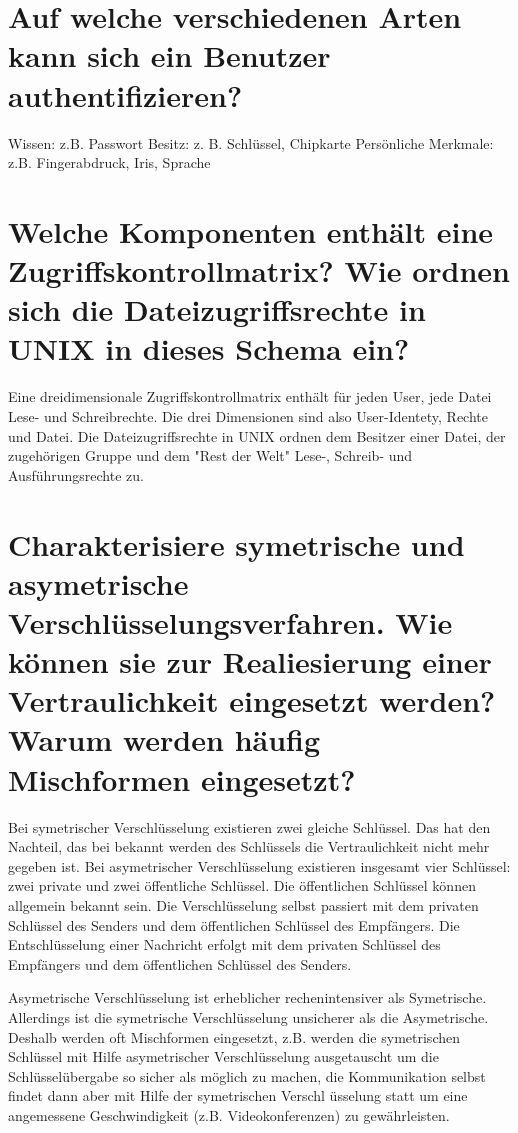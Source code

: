 \documentclass[12pt,a4paper,ngerman]{scrartcl}
\newcommand{\question}[1]{#1}
\newenvironment {answer}
                {}
                {}
\begin{document}
\section{\question{Auf welche verschiedenen Arten kann sich ein Benutzer authentifizieren?}}
\begin{answer}
Wissen: z.B. Passwort
Besitz: z. B. Schlüssel, Chipkarte
Persönliche Merkmale: z.B. Fingerabdruck, Iris, Sprache
\end{answer}

\section{\question{Welche Komponenten enthält eine Zugriffskontrollmatrix? Wie ordnen sich die Dateizugriffsrechte in UNIX in dieses Schema ein?}}
\begin{answer}
Eine dreidimensionale Zugriffskontrollmatrix enthält für jeden User, jede Datei Lese- und Schreibrechte.
Die drei Dimensionen sind also User-Identety, Rechte und Datei.
Die Dateizugriffsrechte in UNIX ordnen dem Besitzer einer Datei, der zugehörigen Gruppe und
dem "Rest der Welt" Lese-, Schreib- und Ausführungsrechte zu.
\end{answer}

\section{\question{Charakterisiere symetrische und asymetrische Verschlüsselungsverfahren. Wie können sie zur Realiesierung einer Vertraulichkeit eingesetzt werden? Warum werden häufig Mischformen eingesetzt?}}
\begin{answer}
Bei symetrischer Verschlüsselung existieren zwei gleiche Schlüssel. Das hat den Nachteil, das bei bekannt werden des Schlüssels die Vertraulichkeit nicht mehr gegeben ist.
Bei asymetrischer Verschlüsselung existieren insgesamt vier Schlüssel: zwei private und zwei öffentliche Schlüssel. Die öffentlichen Schlüssel können allgemein bekannt sein. Die Verschlüsselung selbst passiert mit dem privaten Schlüssel des Senders und dem öffentlichen Schlüssel des Empfängers.
Die Entschlüsselung einer Nachricht erfolgt mit dem privaten Schlüssel des Empfängers und dem
öffentlichen Schlüssel des Senders.

Asymetrische Verschlüsselung ist erheblicher rechenintensiver als Symetrische. Allerdings ist die
symetrische Verschlüsselung unsicherer als die Asymetrische. Deshalb werden oft Mischformen
eingesetzt, z.B. werden die symetrischen Schlüssel mit Hilfe asymetrischer Verschlüsselung ausgetauscht
um die Schlüsselübergabe so sicher als möglich zu machen, die Kommunikation selbst
findet dann aber mit Hilfe der symetrischen Verschl üsselung statt um eine angemessene Geschwindigkeit
(z.B. Videokonferenzen) zu gewährleisten.
\end{answer}
\end{document}
